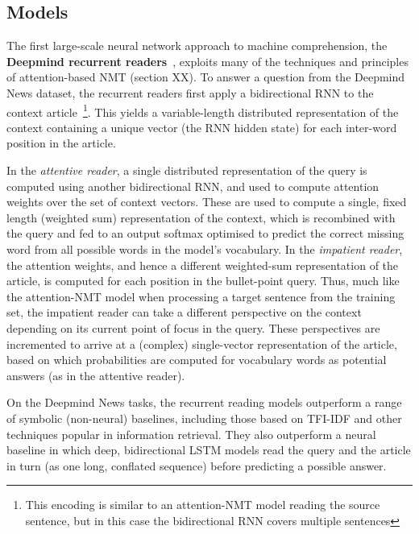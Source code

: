 \documentclass[11pt,letterpaper]{article}
\begin{document}
\subsection{Models}
The first large-scale neural network approach to machine comprehension, the {\bf Deepmind recurrent readers}~\cite{hermann2015teaching}, exploits many of the techniques and principles of attention-based NMT (section XX). To answer a question from the Deepmind News dataset, the recurrent readers first apply a bidirectional RNN to the context article~\footnote{This encoding is similar to an attention-NMT model reading the source sentence, but in this case the bidirectional RNN covers multiple sentences}. This yields a variable-length distributed representation of the context containing a unique vector (the RNN hidden state) for each inter-word position in the article. 

In the \emph{attentive reader}, a single distributed representation of the query is computed using another bidirectional RNN, and used to compute attention weights over the set of context vectors. These are used to compute a single, fixed length (weighted sum) representation of the context, which is recombined with the query and fed to an output softmax optimised to predict the correct missing word from all possible words in the model's vocabulary.  In the \emph{impatient reader}, the attention weights, and hence a different weighted-sum representation of the article, is computed for each position in the bullet-point query. Thus, much like the attention-NMT model when processing a target sentence from the training set, the impatient reader can take a different perspective on the context depending on its current point of focus in the query. These perspectives are incremented to arrive at a (complex) single-vector representation of the article, based on which probabilities are computed for vocabulary words as potential answers (as in the attentive reader).

On the Deepmind News tasks, the recurrent reading models outperform a range of symbolic (non-neural) baselines, including those based on TFI-IDF and other techniques popular in information retrieval. They also outperform a neural baseline in which deep, bidirectional LSTM models read the query and the article in turn (as one long, conflated sequence) before predicting a possible answer.
\end{document}
